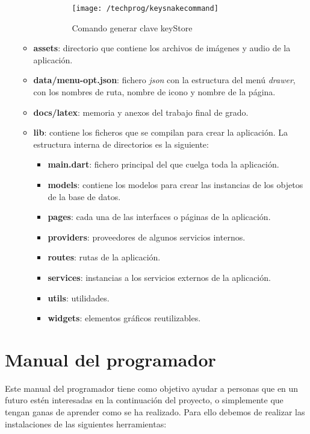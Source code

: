 \begin{itemize}
\begin{itemize}
\begin{itemize}
		\begin{figure}%
			\centering
			\texttt{[image: /techprog/keysnakecommand]}
			\caption{Comando generar clave keyStore}
			\label{fig:commandkey}
		\end{figure}
	

	 
	\end{itemize}
	\item \textbf{assets}: directorio que contiene los archivos de imágenes y audio de la aplicación. 
	\item \textbf{data/menu-opt.json}: fichero \emph{json} con la estructura del menú \emph{drawer}, con los nombres de ruta, nombre de icono y nombre de la página. 
	\item \textbf{docs/latex}: memoria y anexos del trabajo final de grado.
	\item \textbf{lib}: contiene los ficheros que se compilan para crear la aplicación. La estructura interna de directorios es la siguiente:
	\begin{itemize}
		\item \textbf{main.dart}: fichero principal del que cuelga toda la aplicación.
		\item \textbf{models}: contiene los modelos para crear las instancias de los objetos de la base de datos.
		\item \textbf{pages}: cada una de las interfaces o páginas de la aplicación.
		\item \textbf{providers}: proveedores de algunos servicios internos.
		\item \textbf{routes}: rutas de la aplicación.
		\item \textbf{services}: instancias a los servicios externos de la aplicación.
		\item \textbf{utils}: utilidades.
		\item \textbf{widgets}: elementos gráficos reutilizables.
		 
	\end{itemize}
\end{itemize}
\end{itemize}

\section{Manual del programador}
Este manual del programador tiene como objetivo ayudar a personas que en un futuro estén interesadas en la continuación del proyecto, o simplemente que tengan ganas de aprender como se ha realizado. Para ello debemos de realizar las instalaciones de las siguientes herramientas:

